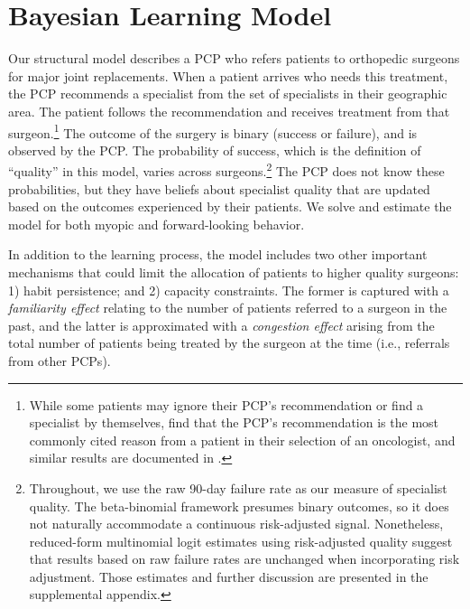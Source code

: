\documentclass[12pt]{article}
\begin{document}

\section{Bayesian Learning Model}
\label{sec:model}

Our structural model describes a PCP who refers patients to orthopedic surgeons for major joint replacements. When a patient arrives who needs this treatment, the PCP recommends a specialist from the set of specialists in their geographic area. The patient follows the recommendation and receives treatment from that surgeon.\footnote{While some patients may ignore their PCP's recommendation or find a specialist by themselves, \cite{freedman2015} find that the PCP's recommendation is the most commonly cited reason from a patient in their selection of an oncologist, and similar results are documented in \cite{barkowski2018}.}
The outcome of the surgery is binary (success or failure), and is observed by the PCP.  The probability of success, which is the definition of ``quality'' in this model,  varies across surgeons.\footnote{Throughout, we use the raw 90-day failure rate as our measure of specialist quality. The beta-binomial framework presumes binary outcomes, so it does not naturally accommodate a continuous risk-adjusted signal. Nonetheless, reduced-form multinomial logit estimates using risk-adjusted quality suggest that results based on raw failure rates are unchanged when incorporating risk adjustment. Those estimates and further discussion are presented in the supplemental appendix.} The PCP does not know these probabilities, but they have beliefs about specialist quality that are updated based on the outcomes experienced by their patients. We solve and estimate the model for both myopic and forward-looking behavior. 

In addition to the learning process, the model includes two other important mechanisms that could limit the allocation of patients to higher quality surgeons: 1) habit persistence; and 2) capacity constraints. The former is captured with a \emph{familiarity effect} relating to the number of patients referred to a surgeon in the past, and the latter is approximated with a \emph{congestion effect} arising from the total number of patients being treated by the surgeon at the time (i.e., referrals from other PCPs).  
\end{document}

